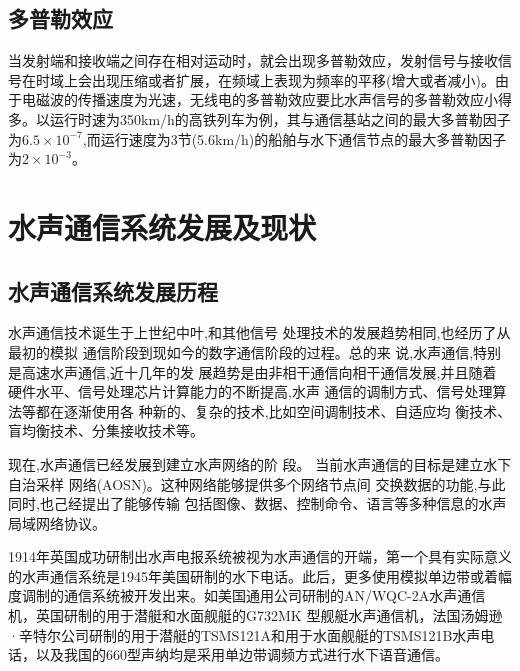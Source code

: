 \subsection{多普勒效应}
当发射端和接收端之间存在相对运动时，就会出现多普勒效应，发射信号与接收信号在时域上会出现压缩或者扩展，在频域上表现为频率的平移(增大或者减小)。由于电磁波的传播速度为光速，无线电的多普勒效应要比水声信号的多普勒效应小得多。以运行时速为350km/h的高铁列车为例，其与通信基站之间的最大多普勒因子为$6.5\times10^{-7}$,而运行速度为3节(5.6km/h)的船舶与水下通信节点的最大多普勒因子为$2\times10^{-3}$。



\section{水声通信系统发展及现状}
\subsection{水声通信系统发展历程}
水声通信技术诞生于上世纪中叶,和其他信号
处理技术的发展趋势相同,也经历了从最初的模拟
通信阶段到现如今的数字通信阶段的过程。总的来
说,水声通信,特别是高速水声通信,近十几年的发
展趋势是由非相干通信向相干通信发展,并且随着
硬件水平、信号处理芯片计算能力的不断提高,水声
通信的调制方式、信号处理算法等都在逐渐使用各
种新的、复杂的技术,比如空间调制技术、自适应均
衡技术、盲均衡技术、分集接收技术等。

现在,水声通信已经发展到建立水声网络的阶
段。
当前水声通信的目标是建立水下自治采样
网络(AOSN)。这种网络能够提供多个网络节点间
交换数据的功能,与此同时,也己经提出了能够传输
包括图像、数据、控制命令、语言等多种信息的水声
局域网络协议。

1914年英国成功研制出水声电报系统被视为水声通信的开端，第一个具有实际意义的水声通信系统是1945年美国研制的水下电话。此后，更多使用模拟单边带或着幅度调制的通信系统被开发出来。如美国通用公司研制的AN/WQC-2A水声通信机，英国研制的用于潜艇和水面舰艇的G732MK \uppercase\expandafter{} 型舰艇水声通信机，法国汤姆逊·辛特尔公司研制的用于潜艇的TSMS121A和用于水面舰艇的TSMS121B水声电话，以及我国的660型声纳均是采用单边带调频方式进行水下语音通信。

